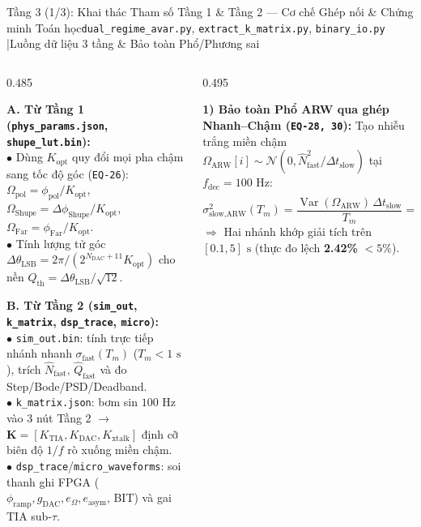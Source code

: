 \documentclass[aspectratio=169,8pt]{beamer}
\begin{document}
\begin{frame}{Tầng 3 (1/3): Khai thác Tham số Tầng 1 \& Tầng 2 — Cơ chế Ghép nối \& Chứng minh Toán học}{\texttt{dual\_regime\_avar.py}, \texttt{extract\_k\_matrix.py}, \texttt{binary\_io.py} \enspace|\enspace Luồng dữ liệu 3 tầng \& Bảo toàn Phổ/Phương sai}
\vspace{-0.06cm}
\begin{columns}[T]
  \begin{column}{0.485\textwidth}
    \begin{eqbox}
      {\scriptsize
      \textbf{\color{AcadNavy}A. Từ Tầng 1 (\texttt{phys\_params.json}, \texttt{shupe\_lut.bin}):}\\
      $\bullet$ Dùng $K_{\text{opt}}$ quy đổi mọi pha chậm sang tốc độ góc (\texttt{EQ-26}):
      $\Omega_{\text{pol}}=\phi_{\text{pol}}/K_{\text{opt}}$, $\Omega_{\text{Shupe}}=\Delta\phi_{\text{Shupe}}/K_{\text{opt}}$, $\Omega_{\text{Far}}=\phi_{\text{Far}}/K_{\text{opt}}$.\\
      $\bullet$ Tính lượng tử góc $\Delta\theta_{\text{LSB}}=2\pi/(2^{N_{\text{DAC}}+11}K_{\text{opt}})$ cho nền $Q_{\text{th}}=\Delta\theta_{\text{LSB}}/\sqrt{12}$.

      \vspace{3.5pt}
      \textbf{\color{AcadTeal}B. Từ Tầng 2 (\texttt{sim\_out}, \texttt{k\_matrix}, \texttt{dsp\_trace}, \texttt{micro}):}\\
      $\bullet$ \texttt{sim\_out.bin}: tính trực tiếp nhánh nhanh $\sigma_{\text{fast}}(T_m)$ ($T_m<1\text{ s}$), trích $\hat{N}_{\text{fast}},\,\hat{Q}_{\text{fast}}$ và đo Step/Bode/PSD/Deadband.\\
      $\bullet$ \texttt{k\_matrix.json}: bơm sin $100\text{ Hz}$ vào 3 nút Tầng 2 $\to$ $\mathbf{K}=[K_{\text{TIA}},K_{\text{DAC}},K_{\text{xtalk}}]$ định cỡ biên độ $1/f$ rò xuống miền chậm.\\
      $\bullet$ \texttt{dsp\_trace}/\texttt{micro\_waveforms}: soi thanh ghi FPGA ($\phi_{\text{ramp}},g_{\text{DAC}},e_\Omega,e_{\text{asym}}$, BIT) và gai TIA sub-$\tau$.}
    \end{eqbox}
  \end{column}
  \begin{column}{0.495\textwidth}
    \begin{remarkbox}
      {\scriptsize
      \textbf{1) Bảo toàn Phổ ARW qua ghép Nhanh–Chậm (\texttt{EQ-28, 30}):}
      Tạo nhiễu trắng miền chậm $\Omega_{\text{ARW}}[i]\sim\mathcal{N}(0,\hat{N}_{\text{fast}}^2/\Delta t_{\text{slow}})$ tại $f_{\text{dec}}=100\text{ Hz}$:
      \[
        \sigma_{\text{slow,ARW}}^2(T_m)=\frac{\operatorname{Var}(\Omega_{\text{ARW}})\,\Delta t_{\text{slow}}}{T_m}=\frac{\hat{N}_{\text{fast}}^2}{T_m}\equiv\sigma_{\text{fast,ARW}}^2(T_m)
      \]
      $\Rightarrow$ Hai nhánh khớp giải tích trên $[0.1,5]\text{ s}$ (thực đo lệch \textbf{2.42\%} $<5\%$).

}
\end{remarkbox}
\end{column}
\end{columns}
\end{frame}
\end{document}
